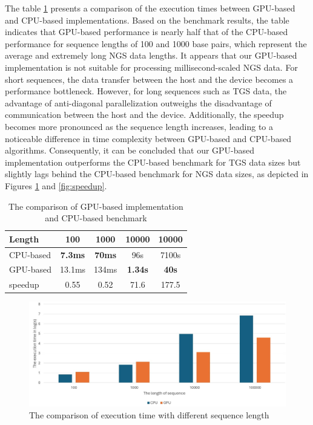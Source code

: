 \documentclass[PhD]{PHlab-thesis}
\begin{document}
\newpage
The table \ref{tab:GPUCPU and Speedup} presents a comparison of the execution times between GPU-based and CPU-based implementations.
Based on the benchmark results, the table indicates that GPU-based performance is nearly half that of the CPU-based performance for sequence lengths of 100 and 1000 base pairs, which represent the average and extremely long NGS data lengths. It appears that our GPU-based implementation is not suitable for processing millisecond-scaled NGS data. For short sequences, the data transfer between the host and the device becomes a performance bottleneck. However, for long sequences such as TGS data, the advantage of anti-diagonal parallelization outweighs the disadvantage of communication between the host and the device. Additionally, the speedup becomes more pronounced as the sequence length increases, leading to a noticeable difference in time complexity between GPU-based and CPU-based algorithms. Consequently, it can be concluded that our GPU-based implementation outperforms the CPU-based benchmark for TGS data sizes but slightly lags behind the CPU-based benchmark for NGS data sizes, as depicted in Figures \ref{fig:GPUCPU} and \ref{fig:speedup}.
\begin{table}[h]
    \centering
    \begin{tabular}{|l|c|c|c|c|}
        \hline
        Length &100& 1000 & 10000 & 10000\\
        \hline
        CPU-based & \textbf{7.3ms}& \textbf{70ms}& 96s &7100s\\
        \hline
        GPU-based &13.1ms & 134ms& \textbf{1.34s}&\textbf{40s}\\
        \hline
        speedup & 0.55 & 0.52 & 71.6 & 177.5\\
        \hline
    \end{tabular}
    \caption{The comparison of GPU-based implementation and CPU-based benchmark}
    \label{tab:GPUCPU and Speedup}
\end{table}

\begin{figure}[h]
    \centering
    \includegraphics[width=1\linewidth]{figure/GPUCPU.jpg}
    \caption{The comparison of execution time with different sequence length}
    \label{fig:GPUCPU}
\end{figure}
\end{document}
